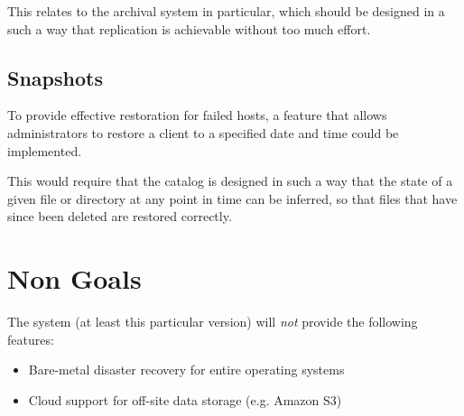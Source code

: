 This relates to the archival system in particular, which should be designed in
a such a way that replication is achievable without too much effort.

\subsection{Snapshots}

To provide effective restoration for failed hosts, a feature that allows
administrators to restore a client to a specified date and time could be
implemented.

This would require that the catalog is designed in such a way that the state of
a given file or directory at any point in time can be inferred, so that files
that have since been deleted are restored correctly.

\section{Non Goals}

The system (at least this particular version) will \emph{not} provide the
following features:

\begin{itemize}
    \item Bare-metal disaster recovery for entire operating systems
    \item Cloud support for off-site data storage (e.g. Amazon S3)
\end{itemize}
